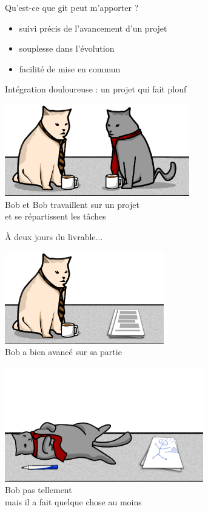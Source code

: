 \documentclass{beamer}
\begin{document}
\begin{frame}{Qu'est-ce que git peut m'apporter ?}
	\begin{itemize}
		\item suivi précis de l'avancement d'un projet
		\item souplesse dans l'évolution
		\item facilité de mise en commun
	\end{itemize}
\end{frame}

\begin{frame}{Intégration douloureuse : un projet qui fait plouf}
	\begin{center}
		\includegraphics[height=4cm]{img/bob_bob}\\
		\Large{Bob et Bob travaillent sur un projet\\et se répartissent les t\^aches}
	\end{center}
\end{frame}

\begin{frame}{À deux jours du livrable...}
	\begin{center}
		\includegraphics[height=4cm]{img/bob1}\\
		\Large{Bob a bien avancé sur sa partie}
	\end{center}
\end{frame}

\begin{frame}
	\begin{center}
		\includegraphics[height=5cm]{img/bob2}\\
		\Large{Bob pas tellement\\mais il a fait quelque chose au moins}
	\end{center}
\end{frame}
\end{document}
